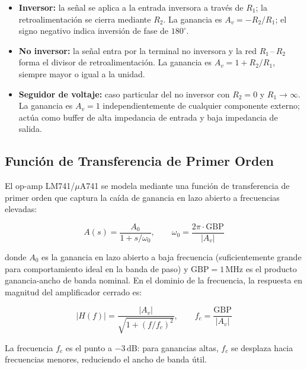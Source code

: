 ﻿\documentclass[12pt, letterpaper]{article}
\begin{document}
\begin{itemize}[leftmargin=2em]
    \item \textbf{Inversor:} la señal se aplica a la entrada inversora a través
          de \(R_1\); la retroalimentación se cierra mediante \(R_2\). La ganancia
          es \(A_v = -R_2/R_1\); el signo negativo indica inversión de fase de
          \(180^\circ\).
    \item \textbf{No inversor:} la señal entra por la terminal no inversora y la
          red \(R_1\)\,--\,\(R_2\) forma el divisor de retroalimentación. La
          ganancia es \(A_v = 1 + R_2/R_1\), siempre mayor o igual a la unidad.
    \item \textbf{Seguidor de voltaje:} caso particular del no inversor con
          \(R_2 = 0\) y \(R_1 \to \infty\). La ganancia es \(A_v = 1\)
          independientemente de cualquier componente externo; actúa como buffer
          de alta impedancia de entrada y baja impedancia de salida.
\end{itemize}

\subsection{Función de Transferencia de Primer Orden}

El op-amp LM741/\(\mu\)A741 %
se modela mediante una función de transferencia de primer orden \cite{razavi2017} que captura
la caída de ganancia en lazo abierto a frecuencias elevadas:

\begin{equation}
    A(s) = \frac{A_0}{1 + s/\omega_0}, \qquad
    \omega_0 = \frac{2\pi \cdot \mathrm{GBP}}{|A_v|}
\end{equation}

donde \(A_0\) es la ganancia en lazo abierto a baja frecuencia (suficientemente
grande para comportamiento ideal en la banda de paso) y \(\mathrm{GBP} =
1\,\text{MHz}\) es el producto ganancia-ancho de banda nominal. En el dominio
de la frecuencia, la respuesta en magnitud del amplificador cerrado es:

\begin{equation}
    |H(f)| = \frac{|A_v|}{\sqrt{1 + (f/f_c)^2}}, \qquad
    f_c = \frac{\mathrm{GBP}}{|A_v|}
\end{equation}

La frecuencia \(f_c\) es el punto a \(-3\,\text{dB}\): para ganancias altas,
\(f_c\) se desplaza hacia frecuencias menores, reduciendo el ancho de banda útil.
\end{document}

